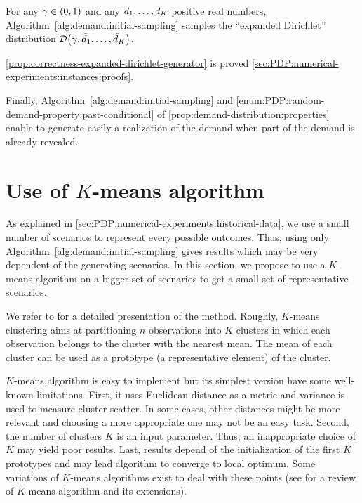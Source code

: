 \begin{prop}\label{prop:correctness-expanded-dirichlet-generator}
For any $\gamma\in\bracket{0,1}$ and any $\tilde{d}_1,\ldots,\tilde{d}_K$ positive real numbers, Algorithm~\ref{alg:demand:initial-sampling} samples the ``expanded Dirichlet'' distribution $\cD\bracket{\gamma,\tilde{\demand}_1,\ldots,\tilde{\demand}_K}$.
\end{prop}


\cref{prop:correctness-expanded-dirichlet-generator} is proved \cref{sec:PDP:numerical-experiments:instances:proofs}.


Finally, Algorithm~\ref{alg:demand:initial-sampling} and \cref{enum:PDP:random-demand-property:past-conditional} of \cref{prop:demand-distribution:properties} enable to generate easily a realization of the demand when part of the demand is already revealed.

\section{Use of $K$-means algorithm}
\label{sec:PDP:numerical-experiments:k-means}


As explained in \cref{sec:PDP:numerical-experiments:historical-data}, we use a small number of scenarios to represent every possible outcomes.
Thus, using only Algorithm~\ref{alg:demand:initial-sampling} gives results which may be very dependent of the generating scenarios.
In this section, we propose to use a $K$-means algorithm on a bigger set of scenarios to get a small set of representative scenarios.


We refer to \citet[Chapter 14]{Hastie2009} for a detailed presentation of the method.
Roughly, $K$-means clustering aims at partitioning $n$ observations into $K$ clusters in which each observation belongs to the cluster with the nearest mean.
The mean of each cluster can be used as a prototype (\ie a representative element) of the cluster.


$K$-means algorithm is easy to implement but its simplest version have some well-known limitations.
First, it uses Euclidean distance as a metric and variance is used to measure cluster scatter.
In some cases, other distances might be more relevant and choosing a more appropriate one may not be an easy task.
Second, the number of clusters $K$ is an input parameter.
Thus, an inappropriate choice of $K$ may yield poor results.
Last, results depend of the initialization of the first $K$ prototypes and may lead algorithm to converge to local optimum.
Some variations of $K$-means algorithms exist to deal with these points (see \citet{Jain2010} for a review of $K$-means algorithm and its extensions).


